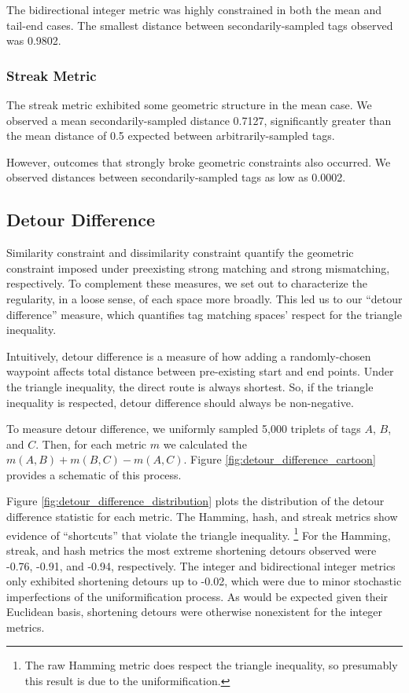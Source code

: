 The bidirectional integer metric was highly constrained in both the mean and tail-end cases.
The smallest distance between secondarily-sampled tags observed was 0.9802.

\subsubsection{Streak Metric}

The streak metric exhibited some geometric structure in the mean case. We observed a mean secondarily-sampled distance 0.7127, significantly greater than the mean distance of 0.5 expected between arbitrarily-sampled tags.

However, outcomes that strongly broke geometric constraints also occurred.
We observed distances between secondarily-sampled tags as low as 0.0002.


\subsection{Detour Difference} \label{sec:detour_difference}



Similarity constraint and dissimilarity constraint quantify the geometric constraint imposed under preexisting strong matching and strong mismatching, respectively.
To complement these measures, we set out to characterize the regularity, in a loose sense, of each space more broadly.
This led us to our ``detour difference'' measure, which quantifies tag matching spaces' respect for the triangle inequality.

Intuitively, detour difference is a measure of how adding a randomly-chosen waypoint affects total distance between pre-existing start and end points.
Under the triangle inequality, the direct route is always shortest.
So, if the triangle inequality is respected, detour difference should always be non-negative.

To measure detour difference, we uniformly sampled 5,000 triplets of tags $A$, $B$, and $C$.
Then, for each metric $m$ we calculated the $m(A, B) + m(B, C) - m(A, C)$.
Figure \ref{fig:detour_difference_cartoon} provides a schematic of this process.

Figure \ref{fig:detour_difference_distribution} plots the distribution of the detour difference statistic for each metric.
The Hamming, hash, and streak metrics show evidence of ``shortcuts'' that violate the triangle inequality.%
\footnote{%
The raw Hamming metric does respect the triangle inequality, so presumably this result is due to the uniformification.
}
For the Hamming, streak, and hash metrics the most extreme shortening detours observed were -0.76, -0.91, and -0.94, respectively.
The integer and bidirectional integer metrics only exhibited shortening detours up to -0.02, which were due to minor stochastic imperfections of the uniformification process.
As would be expected given their Euclidean basis, shortening detours were otherwise nonexistent for the integer metrics.

